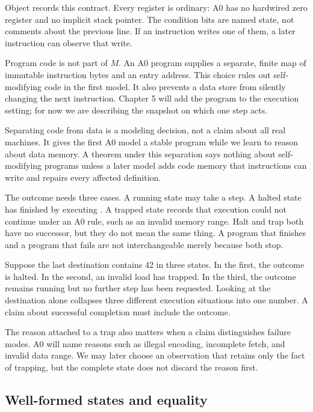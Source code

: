 Object  records this contract. Every register is ordinary:
A0 has no hardwired zero register and no implicit stack pointer. The condition
bits are named state, not comments about the previous line. If an instruction
writes one of them, a later instruction can observe that write.

Program code is not part of \(M\). An A0 program supplies a separate, finite
map of immutable instruction bytes and an entry address. This choice rules out
self-modifying code in the first model. It also prevents a data store from
silently changing the next instruction. Chapter 5 will add the program to the
execution setting; for now we are describing the snapshot on which one step
acts.

Separating code from data is a modeling decision, not a claim about all real
machines. It gives the first A0 model a stable program while we learn to reason
about data memory. A theorem under this separation says nothing about
self-modifying programs unless a later model adds code memory that instructions
can write and repairs every affected definition.

The outcome needs three cases. A running state may take a step. A halted state
has finished by executing . A trapped state records that execution
could not continue under an A0 rule, such as an invalid memory range. Halt and
trap both have no successor, but they do not mean the same thing. A program
that finishes and a program that fails are not interchangeable merely because
both stop.

\begin{example}[title={Three stopped descriptions}]
Suppose the last destination contains 42 in three states. In the first, the
outcome is halted. In the second, an invalid load has trapped. In the third,
the outcome remains running but no further step has been requested. Looking at
the destination alone collapses three different execution situations into one
number. A claim about successful completion must include the outcome.
\end{example}

The reason attached to a trap also matters when a claim distinguishes failure
modes. A0 will name reasons such as illegal encoding, incomplete fetch, and
invalid data range. We may later choose an observation that retains only the
fact of trapping, but the complete state does not discard the reason first.

\subsection{Well-formed states and equality}

